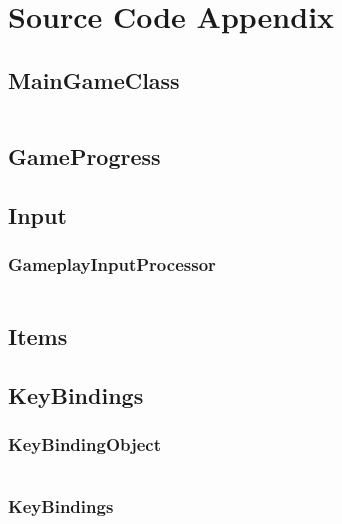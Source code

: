 \documentclass[12p]{article}
\begin{document}
\newpage
\printbibliography[heading=bibintoc,title={References}]


\newpage
\appendix
\section{Source Code Appendix}

\subsection{MainGameClass} \label{MainGameClass.java}
\inputminted[linenos,breaklines]{java}{code/MainGameClass.java}

\subsection{GameProgress}

\subsection{Input}
\subsubsection{GameplayInputProcessor} \label{GameplayInputProcessor.java}
\inputminted[linenos,breaklines]{java}{code/Input/GameplayInputProcessor.java}

\subsection{Items}

\subsection{KeyBindings}
\subsubsection{KeyBindingObject} \label{KeyBindingObject.java}
\inputminted[linenos,breaklines]{java}{code/KeyBindings/KeyBindingObject.java}
\subsubsection{KeyBindings} \label{KeyBindings.java}
\inputminted[linenos,breaklines]{java}{code/KeyBindings/KeyBindings.java}
\end{document}
